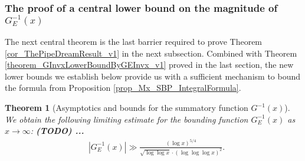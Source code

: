 \documentclass[11pt,reqno,a4letter]{article}
\numberwithin{figure}{section}
\numberwithin{table}{section}
\theoremstyle{plain}
\newtheorem{theorem}{Theorem}
\numberwithin{theorem}{section}
\theoremstyle{definition}
\newcommand{\NBRef}[1]{}
\begin{document}
\subsubsection{The proof of a central lower bound on the magnitude of $G_{E}^{-1}(x)$} 

The next central theorem is the last barrier required to prove 
Theorem \ref{cor_ThePipeDreamResult_v1} 
in the next subsection. 
Combined with Theorem \ref{theorem_GInvxLowerBoundByGEInvx_v1} 
proved in the last section, the new lower bounds we establish below provide us 
with a sufficient mechanism to bound the formula from 
Proposition \ref{prop_Mx_SBP_IntegralFormula}. 

\begin{theorem}[Asymptotics and bounds for the summatory function $G^{-1}(x)$] 
\label{theorem_gInv_GeneralAsymptoticsForms}
We obtain the following limiting estimate for the bounding function 
$G_{E}^{-1}(x)$ as $x \rightarrow \infty$: 
\textbf{(TODO) ... } 
\begin{align*} 
 & \left\lvert G_{E}^{-1}\left(x\right) \right\rvert
     \gg \frac{(\log x)^{5/4}}{ 
     \sqrt{\log\log x} \cdot (\log\log\log x)^2}. 
\end{align*} 
\end{theorem} 
\NBRef{A10-2020.04-26} 
\end{document}
